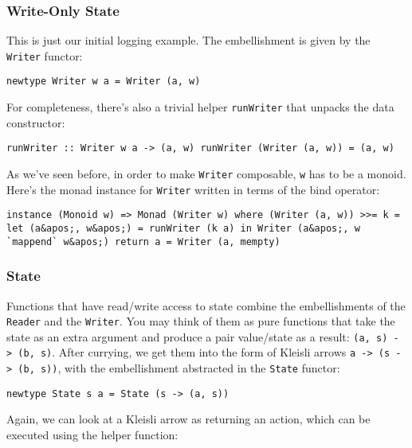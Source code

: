 \subsubsection{Write-Only State}\label{write-only-state}

This is just our initial logging example. The embellishment is given by
the \texttt{Writer} functor:

\begin{verbatim}
newtype Writer w a = Writer (a, w)
\end{verbatim}

For completeness, there's also a trivial helper \texttt{runWriter} that
unpacks the data constructor:

\begin{verbatim}
runWriter :: Writer w a -> (a, w) runWriter (Writer (a, w)) = (a, w)
\end{verbatim}

As we've seen before, in order to make \texttt{Writer} composable,
\texttt{w} has to be a monoid. Here's the monad instance for
\texttt{Writer} written in terms of the bind operator:

\begin{verbatim}
instance (Monoid w) => Monad (Writer w) where (Writer (a, w)) >>= k = let (a&apos;, w&apos;) = runWriter (k a) in Writer (a&apos;, w `mappend` w&apos;) return a = Writer (a, mempty)
\end{verbatim}

\subsubsection{State}\label{state}

Functions that have read/write access to state combine the
embellishments of the \texttt{Reader} and the \texttt{Writer}. You may
think of them as pure functions that take the state as an extra argument
and produce a pair value/state as a result:
\texttt{(a,\ s)\ -\textgreater{}\ (b,\ s)}. After currying, we get them
into the form of Kleisli arrows
\texttt{a\ -\textgreater{}\ (s\ -\textgreater{}\ (b,\ s))}, with the
embellishment abstracted in the \texttt{State} functor:

\begin{verbatim}
newtype State s a = State (s -> (a, s))
\end{verbatim}

Again, we can look at a Kleisli arrow as returning an action, which can
be executed using the helper function:

